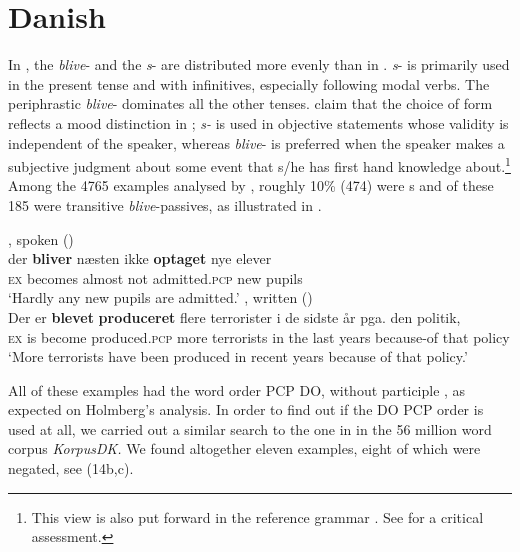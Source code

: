 \documentclass[output=paper]{LSP/langsci}
\begin{document}
\section{Danish} %
In , the \textit{blive}{}- and  the \textit{s}{}- are distributed more evenly than in . \textit{s}{}- is primarily used in the present tense and with infinitives, especially following modal verbs. The periphrastic \textit{blive}{}- dominates all the other tenses.  \citet{HeltoftJakobsen1996} claim that the choice of  form reflects a mood distinction in ; \textit{s-} is used in objective statements whose validity is independent of the speaker, whereas \textit{blive}{}- is preferred when the speaker makes a subjective judgment about some event that s/he has first hand knowledge about.\footnote{This view is also put forward in the  reference grammar  \citep[747ff]{HansenHeltoft2011}. See \citet[101ff]{Laanemets2012} for a critical assessment.} Among the 4765   examples analysed by \citet{Laanemets2012}, roughly 10\% (474) were s and of these 185 were transitive \textit{blive}{}-passives, as illustrated in .

\ea%
    \label{ex:engdahl:13}
    \ea
    , spoken (\citealt{Laanemets2012})\\
\gll der \textbf{bliver}   næsten   ikke \textbf{optaget}    nye elever\\
    \textsc{ex}  becomes  almost    not    admitted.\textsc{pcp}  new  pupils\\
    \glt ‘Hardly any new pupils are admitted.'
\ex
    , written (\citealt{Laanemets2012})\\
\gll     Der er \textbf{blevet} \textbf{produceret} flere terrorister   i     de sidste år pga. den politik,\\
    \textsc{ex}    is    become  produced.\textsc{pcp} more    terrorists in   the  last  years because-of  that  policy\\
    \glt ‘More terrorists  have been produced in recent years  because of that policy.'
\z\z

\noindent All of these examples had the word order PCP DO, without participle , as expected on Holmberg’s analysis. In order to find out if the DO PCP order is used at all, we carried out a similar search to the one in  in the 56 million word corpus \textit{KorpusDK.} We found altogether eleven examples, eight of which were negated, see (14b,c).
\end{document}
